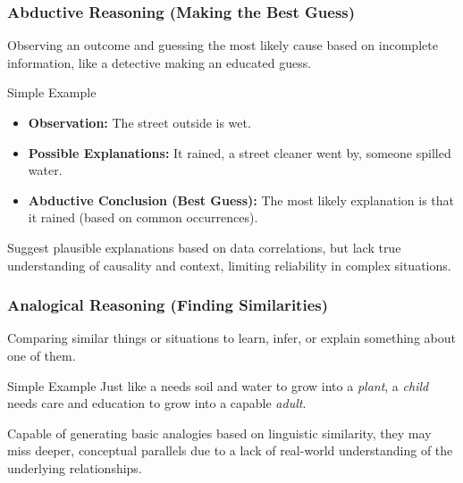 \begin{frame}
\frametitle{Abductive Reasoning (Making the Best Guess)}

Observing an outcome and guessing the most likely cause based on incomplete information, like a detective making an educated guess.

\bigskip

\begin{block}{Simple Example}
  \begin{itemize}
    \item \textbf{Observation:} The street outside is wet.
    \item \textbf{Possible Explanations:} It rained, a street cleaner went by, someone spilled water.
    \item \textbf{Abductive Conclusion (Best Guess):} The most likely explanation is that it rained (based on common occurrences).
  \end{itemize}
\end{block}

\bigskip

 Suggest plausible explanations based on data correlations, but lack true understanding of causality and context, limiting reliability in complex situations.
\end{frame}

\begin{frame}
\frametitle{Analogical Reasoning (Finding Similarities)}

Comparing similar things or situations to learn, infer, or explain something about one of them.

\bigskip

\begin{block}{Simple Example}
  Just like a  needs soil and water to grow into a \textit{plant}, a \textit{child} needs care and education to grow into a capable \textit{adult}.
\end{block}

\bigskip

Capable of generating basic analogies based on linguistic similarity, they may miss deeper, conceptual parallels due to a lack of real-world understanding of the underlying relationships.
\end{frame}
